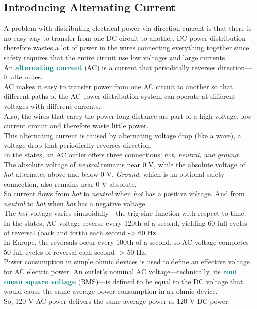 \documentclass[12pt]{article}
\theoremstyle{definition}
\newcommand{\defnterm}[1]{\textbf{\textcolor{teal}{#1}}\index{#1}}
\begin{document}
\subsection{Introducing Alternating Current}
A problem with distributing electrical power via direction current is that there is no easy way to transfer from one DC circuit to another.
DC power distribution therefore wastes a lot of power in the wires connecting everything together since safety requires that the entire circuit use low voltages and large currents. \\

An \defnterm{alternating current} (AC) is a current that periodically reverses direction---it alternates. \\
AC makes it easy to transfer power from one AC circuit to another so that different paths of the AC power-distribution system can operate at different voltages with different currents. \\
Also, the wires that carry the power long distance are part of a high-voltage, low-current circuit and therefore waste little power. \\

This alternating current is caused by alternating voltage drop (like a wave), a voltage drop that periodically reverses direction. \\

In the states, an AC outlet offers three connections: \emph{hot, neutral, \emph{and} ground}. \\
The absolute voltage of \emph{neutral} remains near 0 V, while the absolute voltage of \emph{hot} alternates above and below 0 V.
\emph{Ground}, which is an optional safety connection, also remains near 0 V absolute. \\
So current flows from \emph{hot} to \emph{neutral} when \emph{hot} has a positive voltage.
And from \emph{neutral} to \emph{hot} when \emph{hot} has a negative voltage. \\

The \emph{hot} voltage varies sinusoidally---the trig sine function with respect to time.
In the states, AC voltage reverse every 120th of a second, yielding 60 full cycles of reversal (back and forth) each second -> 60 Hz. \\
In Europe, the reversals occur every 100th of a second, so AC voltage completes 50 full cycles of reversal each second -> 50 Hz. \\

Power consumption in simple ohmic devices is used to define an effective voltage for AC electric power.
An outlet's nominal AC voltage---technically, its \defnterm{root mean square voltage} (RMS)---is defined to be equal to the DC voltage that would cause the same average power consumption in an ohmic device. \\
So, 120-V AC power delivers the same average power as 120-V DC power. \\
\end{document}
